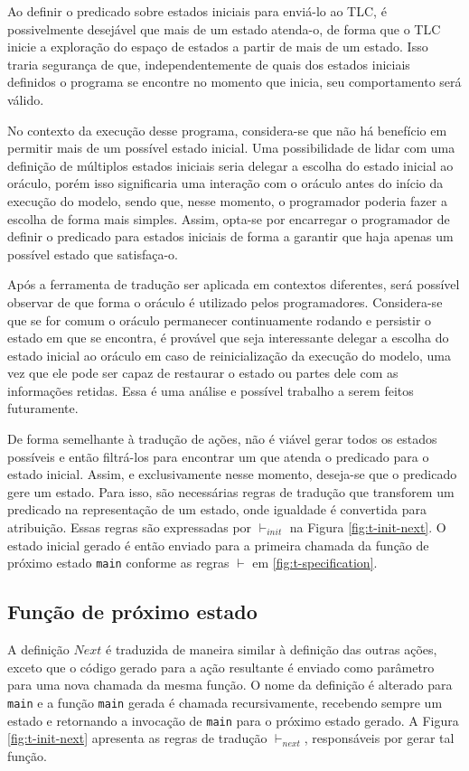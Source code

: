 Ao definir o predicado sobre estados iniciais para enviá-lo ao TLC, é
possivelmente desejável que mais de um estado atenda-o, de forma que o TLC
inicie a exploração do espaço de estados a partir de mais de um estado. Isso
traria segurança de que, independentemente de quais dos estados iniciais definidos o
programa se encontre no momento que inicia, seu comportamento será válido.

No contexto da execução desse programa, considera-se que não há benefício em
permitir mais de um possível estado inicial. Uma possibilidade de lidar com uma
definição de múltiplos estados iniciais seria delegar a escolha do estado
inicial ao oráculo, porém isso significaria uma interação com o oráculo antes do
início da execução do modelo, sendo que, nesse momento, o programador poderia
fazer a escolha de forma mais simples. Assim, opta-se por encarregar o
programador de definir o predicado para estados iniciais de forma a garantir que
haja apenas um possível estado que satisfaça-o.

Após a ferramenta de tradução ser aplicada em contextos diferentes, será
possível observar de que forma o oráculo é utilizado pelos programadores.
Considera-se que se for comum o oráculo permanecer continuamente rodando e
persistir o estado em que se encontra, é provável que seja interessante delegar a
escolha do estado inicial ao oráculo em caso de reinicialização da execução do
modelo, uma vez que ele pode ser capaz de restaurar o estado ou partes dele com
as informações retidas. Essa é uma análise e possível trabalho a serem feitos
futuramente.

De forma semelhante à tradução de ações, não é viável gerar todos os estados
possíveis e então filtrá-los para encontrar um que atenda o predicado para o
estado inicial. Assim, e exclusivamente nesse momento, deseja-se que o predicado
gere um estado. Para isso, são necessárias regras de tradução que transforem um
predicado na representação de um estado, onde igualdade é convertida para
atribuição. Essas regras são expressadas por $\vdash_{init}$ na Figura
\ref{fig:t-init-next}. O estado inicial gerado é então enviado para a primeira
chamada da função de próximo estado \texttt{main} conforme as regras $\vdash$ em \ref{fig:t-specification}.

\subsection{Função de próximo estado}

A definição $Next$ é traduzida de maneira similar à definição das outras ações,
exceto que o código gerado para a ação resultante é enviado como parâmetro para
uma nova chamada da mesma função. O nome da definição é alterado para
\texttt{main} e a função \texttt{main} gerada é chamada recursivamente,
recebendo sempre um estado e retornando a invocação de \texttt{main} para o
próximo estado gerado. A Figura \ref{fig:t-init-next} apresenta as regras de
tradução $\vdash_{next}$, responsáveis por gerar tal função.


